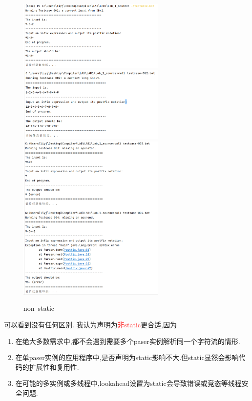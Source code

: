 \documentclass{article}
\begin{document}
\begin{figure}[H]
    \includegraphics[width=0.65\textwidth]{element/1.png}
    \includegraphics[width=0.65\textwidth]{element/2.png}
    \includegraphics[width=0.65\textwidth]{element/3.png}
    \caption{non\ static}
\end{figure}
可以看到没有任何区别. 我认为声明为\textcolor{red}{非static}更合适,因为
\begin{enumerate}
    \item 在绝大多数需求中,都不会遇到需要多个paser实例解析同一个字符流的情形.
    \item 在单paser实例的应用程序中,是否声明为static影响不大.但static显然会影响代码的扩展性和复用性.
    \item 在可能的多实例或多线程中,lookahead设置为static会导致错误或竞态等线程安全问题.
\end{enumerate}
\newpage
\end{document}
